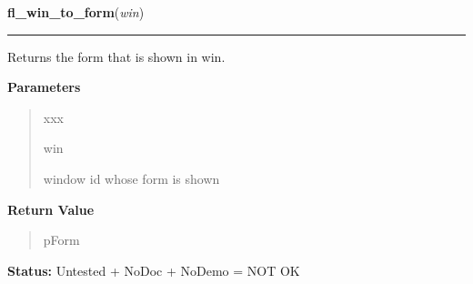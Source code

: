 \hspace{.8\funcindent}\begin{boxedminipage}{\funcwidth}

    \raggedright \textbf{fl\_win\_to\_form}(\textit{win})

    \vspace{-1.5ex}

    \rule{\textwidth}{0.5\fboxrule}
\setlength{\parskip}{2ex}
    Returns the form that is shown in win.

\setlength{\parskip}{1ex}
      \textbf{Parameters}
      \vspace{-1ex}

      \begin{quote}
        \begin{Ventry}{xxx}

          \item[win]

          window id whose form is shown

        \end{Ventry}

      \end{quote}

      \textbf{Return Value}
    \vspace{-1ex}

      \begin{quote}
      pForm

      \end{quote}

\textbf{Status:} Untested + NoDoc + NoDemo = NOT OK



    \end{boxedminipage}

    \label{xformslib:library:fl_set_form_icon}

    \vspace{0.5ex}

